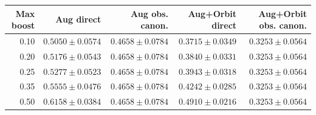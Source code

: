 \begin{tabular}{rrrrr}
\toprule
Max boost & Aug direct & Aug obs. canon. & Aug+Orbit direct & Aug+Orbit obs. canon. \\
\midrule
0.10 & $0.5050\pm0.0574$ & $0.4658\pm0.0784$ & $0.3715\pm0.0349$ & $0.3253\pm0.0564$ \\
0.20 & $0.5176\pm0.0543$ & $0.4658\pm0.0784$ & $0.3840\pm0.0331$ & $0.3253\pm0.0564$ \\
0.25 & $0.5277\pm0.0523$ & $0.4658\pm0.0784$ & $0.3943\pm0.0318$ & $0.3253\pm0.0564$ \\
0.35 & $0.5555\pm0.0476$ & $0.4658\pm0.0784$ & $0.4242\pm0.0285$ & $0.3253\pm0.0564$ \\
0.50 & $0.6158\pm0.0384$ & $0.4658\pm0.0784$ & $0.4910\pm0.0216$ & $0.3253\pm0.0564$ \\
\bottomrule
\end{tabular}
